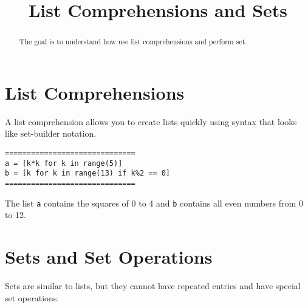 \documentclass{ximera}
\title{List Comprehensions and Sets}
\begin{document}
\begin{abstract}
The goal is to understand how use list comprehensions and perform set.
\end{abstract}
\maketitle

\section{List Comprehensions}

A list comprehension allows you to create lists quickly using syntax that looks like set-builder notation.
\begin{verbatim}
============================== 
a = [k*k for k in range(5)]
b = [k for k in range(13) if k%2 == 0]
==============================
\end{verbatim}
        
The list \verb|a| contains the squares of 0 to 4 and \verb|b| contains all even numbers from 0 to 12.

\section{Sets and Set Operations}

Sets are similar to lists, but they cannot have repeated entries and have special set operations.
\end{document}
